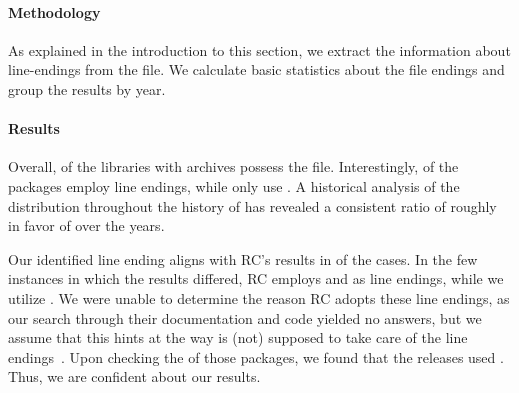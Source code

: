 \documentclass[smallextended]{svjour3}
\newcommand{\maven}[1]{\tool{Maven{#1}}}
\begin{document}
\paragraph{Methodology}
As explained in the introduction to this section, we extract the information about line-endings from the  file.
We calculate basic statistics about the file endings and group the results by year.

\paragraph{Results}
Overall,  of the \maven{} libraries with archives possess the  file.
Interestingly,  of the packages employ  line endings, while only  use . A historical analysis of the distribution throughout the history of \maven{} has revealed a consistent ratio of roughly  in favor of  over the years.

Our identified line ending aligns with RC's results in  of the cases. In the few instances in which the results differed, RC employs  and  as line endings, while we utilize . We were unable to determine the reason RC adopts these line endings, as our search through their documentation and code yielded no answers, but we assume that this hints at the way  is (not) supposed to take care of the line endings~\cite{gitNewline}. Upon checking the  of those packages, we found that the releases used . Thus, we are confident about our results.
\end{document}
